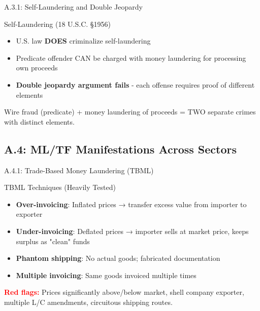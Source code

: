 \documentclass{beamer}
\begin{document}
	\begin{frame}{A.3.1: Self-Laundering and Double Jeopardy}
		\begin{block}{Self-Laundering (18 U.S.C. §1956)}
			\begin{itemize}
				\item U.S. law \textbf{DOES} criminalize self-laundering
				\item Predicate offender CAN be charged with money laundering for processing own proceeds
				\item \textbf{Double jeopardy argument fails} - each offense requires proof of different elements
			\end{itemize}
		\end{block}
		\begin{example}
			Wire fraud (predicate) + money laundering of proceeds = TWO separate crimes with distinct elements.
		\end{example}
	\end{frame}
	
	\subsection{A.4: ML/TF Manifestations Across Sectors}
	
	\begin{frame}{A.4.1: Trade-Based Money Laundering (TBML)}
		\begin{block}{TBML Techniques (Heavily Tested)}
			\begin{itemize}
				\item \textbf{Over-invoicing}: Inflated prices → transfer excess value from importer to exporter
				\item \textbf{Under-invoicing}: Deflated prices → importer sells at market price, keeps surplus as "clean" funds
				\item \textbf{Phantom shipping}: No actual goods; fabricated documentation
				\item \textbf{Multiple invoicing}: Same goods invoiced multiple times
			\end{itemize}
		\end{block}
		\vspace{0.2cm}
		\textcolor{red}{\textbf{ Red flags:}} Prices significantly above/below market, shell company exporter, multiple L/C amendments, circuitous shipping routes.
	\end{frame}
	
\end{document}
